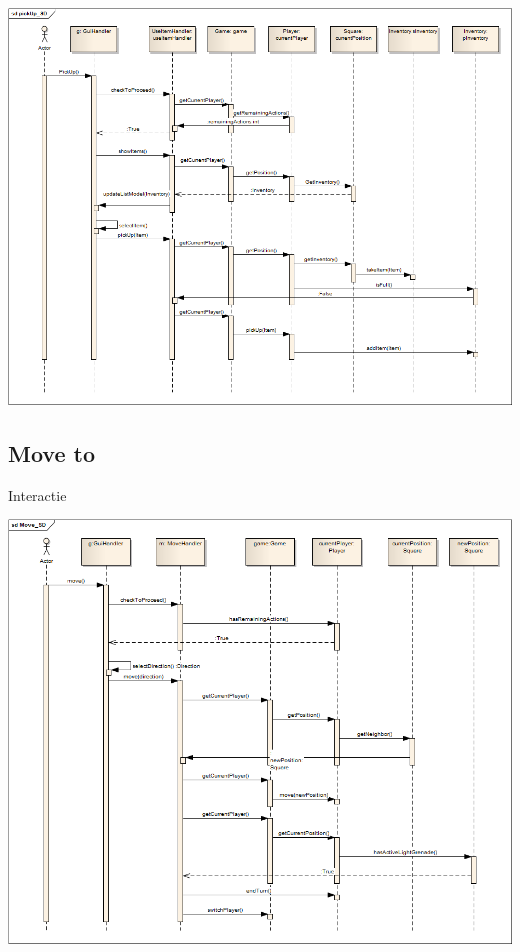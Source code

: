 \documentclass[t]{beamer}
\begin{document}
\begin{frame}[plain]
\begin{center}
\includegraphics[width= 0.90\linewidth]{../uml/pickup_SD.png}
\end{center}
\end{frame}

\subsection{Move to}
\begin{frame}{Interactie}
\begin{multicols}{2}
\tableofcontents[currentsection]
\end{multicols}
\end{frame}

\begin{frame}[plain]
\begin{center}
\includegraphics[width= 1\linewidth]{../uml/move_SD.png}
\end{center}
\end{frame}
\end{document}
